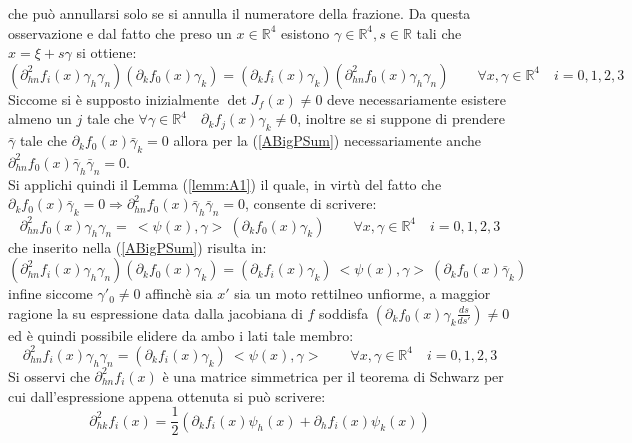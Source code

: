 che può annullarsi solo se si annulla il numeratore della frazione. Da questa osservazione e dal fatto che preso un $x\in \mathbb{R}^4 $ esistono $ \gamma \in
\mathbb{R}^4, s \in \mathbb{R}$ tali che $x=\xi+s\gamma$ si ottiene:
\begin{equation}
    \left(\partial^2_{hn}f_i(x)\gamma_h\gamma_n\right)\left(\partial_kf_0(x)\gamma_k\right)
    = \left(\partial_kf_i(x)\gamma_k\right)\left(\partial^2_{hn}f_0(x)\gamma_h\gamma_n\right) \qquad \forall x,\gamma\in \mathbb{R}^4 \quad i=0,1,2,3  
    \label{ABigPSum}
\end{equation}
Siccome si è supposto inizialmente $\det J_f(x)\neq 0$ deve necessariamente esistere almeno un $j$ tale che $ \forall\gamma\in \mathbb{R}^4\quad\partial_kf_j(x)\gamma_k\neq 0$, 
inoltre se si suppone di prendere $\bar{\gamma}$ tale che $\partial_kf_0(x)\bar{\gamma}_k=0$ allora per la (\ref{ABigPSum}) necessariamente 
anche $\partial^2_{hn}f_0(x)\bar{\gamma}_h\bar{\gamma}_n=0$.\\

Si applichi quindi il Lemma (\ref{lemm:A1}) il quale, in virtù del fatto che $\partial_kf_0(x)\bar{\gamma}_k=0\Rightarrow 
\partial^2_{hn}f_0(x)\bar{\gamma}_h\bar{\gamma}_n=0$, consente di scrivere:
\begin{equation*}
    \partial^2_{hn}f_0(x)\gamma_h\gamma_n=\ <\psi(x),\gamma>\ (\partial_kf_0(x)\gamma_k) \qquad   \forall x,\gamma\in \mathbb{R}^4 \quad i=0,1,2,3  
\end{equation*}
che inserito nella (\ref{ABigPSum}) risulta in:
\begin{equation*}
    \left(\partial^2_{hn}f_i(x)\gamma_h\gamma_n\right)\left(\partial_kf_0(x)\gamma_k\right)
    = \left(\partial_kf_i(x)\gamma_k\right)\ <\psi(x),\gamma>\ (\partial_kf_0(x)\bar{\gamma}_k)
\end{equation*}
infine siccome $\gamma'_0\neq 0$ affinchè sia $x'$ sia un moto rettilneo unfiorme, a maggior ragione la su espressione data dalla jacobiana di $f$ soddisfa $(\partial_kf_0(x)\gamma_k\frac{ds}{ds'})\neq 0$ 
ed è quindi possibile elidere da ambo i lati tale membro:
\begin{equation}
    \partial^2_{hn}f_i(x)\gamma_h\gamma_n=\left(\partial_kf_i(x)\gamma_k\right)\ <\psi(x),\gamma> \qquad   \forall x,\gamma\in \mathbb{R}^4 \quad i=0,1,2,3
    \label{APArtialScal}
\end{equation}
Si osservi che  $\partial^2_{hn}f_i(x)$ è una matrice simmetrica per il teorema di Schwarz per cui dall'espressione appena ottenuta si può scrivere:
\begin{equation}
    \partial^2_{hk}f_i(x)=\frac{1}{2}\left(\partial_kf_i(x)\psi_h(x)+\partial_hf_i(x)\psi_k(x)\right)
    \label{APArtialScalSimm}
\end{equation}


